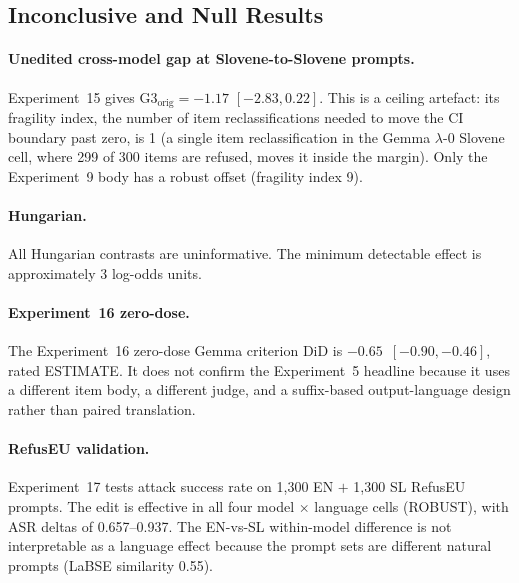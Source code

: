 \documentclass[11pt,letterpaper]{article}
\begin{document}
\subsection{Inconclusive and Null Results}

\paragraph{Unedited cross-model gap at Slovene-to-Slovene prompts.}
Experiment~15 gives $\mathrm{G3}_{\text{orig}} = -1.17$ $[-2.83, 0.22]$.
This is a ceiling artefact: its fragility index, the number of item reclassifications needed to move the CI boundary past zero, is 1 (a single item reclassification in the Gemma $\lambda\text{-}0$ Slovene cell, where 299 of 300 items are refused, moves it inside the margin).
Only the Experiment~9 body has a robust offset (fragility index 9).

\paragraph{Hungarian.}
All Hungarian contrasts are uninformative.
The minimum detectable effect is approximately 3 log-odds units.

\paragraph{Experiment~16 zero-dose.}
The Experiment~16 zero-dose Gemma criterion DiD is $-0.65$~$[-0.90,\allowbreak -0.46]$, rated ESTIMATE.
It does not confirm the Experiment~5 headline because it uses a different item body, a different judge, and a suffix-based output-language design rather than paired translation.

\paragraph{RefusEU validation.}
Experiment~17 tests attack success rate on 1,300 EN $+$ 1,300 SL RefusEU prompts.
The edit is effective in all four model $\times$ language cells (ROBUST), with ASR deltas of 0.657--0.937.
The EN-vs-SL within-model difference is not interpretable as a language effect because the prompt sets are different natural prompts (LaBSE similarity 0.55).
\end{document}
